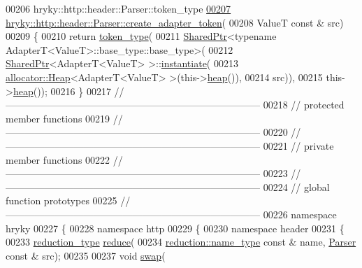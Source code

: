 \begin{DoxyCode}
00206 hryky::http::header::Parser::token\_type
\hypertarget{http__header__parser_8h_source_l00207}{}\hyperlink{classhryky_1_1http_1_1header_1_1_parser_a131ffc5be65b0aafa64241c87de5facd}{00207} \hyperlink{classhryky_1_1http_1_1header_1_1_parser_a131ffc5be65b0aafa64241c87de5facd}{hryky::http::header::Parser::create_adapter_token}(
00208     ValueT \textcolor{keyword}{const} & src)
00209 \{
00210     \textcolor{keywordflow}{return} \hyperlink{classhryky_1_1_vector}{token_type}(
00211         \hyperlink{classhryky_1_1_shared_ptr}{SharedPtr}<\textcolor{keyword}{typename} AdapterT<ValueT>::base\_type::base\_type>(
00212             \hyperlink{classhryky_1_1_shared_ptr}{SharedPtr}<AdapterT<ValueT> >::\hyperlink{namespacehryky_a7e731db6d90571cf1aea6e113d43b6ad}{instantiate}(
00213                 \hyperlink{classhryky_1_1allocator_1_1_heap}{allocator::Heap}<AdapterT<ValueT> >(this->\hyperlink{namespacehryky_1_1memory_1_1global_a6fc6103f67c837aa0f39b359588409cd}{heap}()),
00214                 src)),
00215         this->\hyperlink{namespacehryky_1_1memory_1_1global_a6fc6103f67c837aa0f39b359588409cd}{heap}());
00216 \}
00217 \textcolor{comment}{//
      ------------------------------------------------------------------------------}
00218 \textcolor{comment}{// protected member functions}
00219 \textcolor{comment}{//
      ------------------------------------------------------------------------------}
00220 \textcolor{comment}{//
      ------------------------------------------------------------------------------}
00221 \textcolor{comment}{// private member functions}
00222 \textcolor{comment}{//
      ------------------------------------------------------------------------------}
00223 \textcolor{comment}{//
      ------------------------------------------------------------------------------}
00224 \textcolor{comment}{// global function prototypes}
00225 \textcolor{comment}{//
      ------------------------------------------------------------------------------}
00226 \textcolor{keyword}{namespace }hryky
00227 \{
00228 \textcolor{keyword}{namespace }http
00229 \{
00230 \textcolor{keyword}{namespace }header
00231 \{
00233     \hyperlink{classhryky_1_1_intrusive_ptr}{reduction_type} \hyperlink{namespacehryky_1_1http_a08fc36a78a8e2908140fcd102829a566}{reduce}(
00234         \hyperlink{classhryky_1_1reduction_1_1_string}{reduction::name_type} \textcolor{keyword}{const} & name, \hyperlink{classhryky_1_1http_1_1header_1_1_parser}{Parser} \textcolor{keyword}{const} & src);
00235 
00237     \textcolor{keywordtype}{void} \hyperlink{namespacehryky_1_1http_a38e62595ad532d18fbc65ceb61973aec}{swap}(

\end{DoxyCode}
